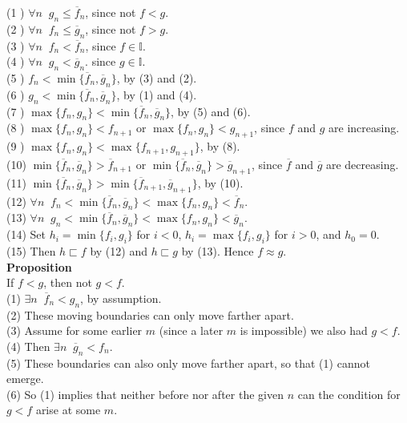\documentclass{article}
\newcommand{\zeqs}{ \mathbb{I}}
\newcommand{\of}{ \overline f}
\newcommand{\og}{ \overline g}
\newcommand{\forks}{ \sqsubset}
\begin{document}
(1  ) $\forall n \;\; g_n \le \of_n$, since not $f < g$.\\
(2  ) $\forall n \;\; f_n \le \og_n$, since not $f > g$.\\
(3  ) $\forall n \;\;f_n < \of_n$, since $f \in \zeqs$.\\
(4  ) $\forall n \;\;g_n < \og_n$. since $g \in \zeqs$.\\
(5  ) $f_n < \min\{\of_n,\og_n\}$, by (3) and (2).\\
(6  ) $g_n < \min\{\of_n,\og_n\}$, by (1) and (4).\\
(7  ) $\max\{f_n,g_n\} < \min\{\of_n,\og_n\}$, by (5) and (6).\\
(8  ) $\max\{f_n,g_n\} < f_{n+1}$ or $\max\{f_{n},g_{n}\} < g_{n+1}$, since $f$ and $g$ are increasing.\\ 
(9  ) $\max\{f_n,g_n\} < \max\{f_{n+1},g_{n+1}\}$, by (8).\\
(10) $\min\{\of_n,\og_n\} > \of_{n+1}$ or $\min\{\of_n,\og_n\} > \og_{n+1}$, since $\of$ and $\og$ are decreasing.\\
(11) $\min\{\of_n,\og_n\} > \min\{\of_{n+1},\og_{n+1}\}$, by (10).\\
(12) $\forall n \;\; f_n < \min\{\of_n,\og_n\} < \max\{f_n,g_n\} < \of_n$.\\
(13) $\forall n \;\; g_n < \min\{\of_n,\og_n\} < \max\{f_n,g_n\} < \og_n$.\\
(14) Set $h_i = \min\{f_i,g_i\}$ for $i < 0$, $h_i = \max\{f_i,g_i\}$ for $ i > 0$, and $h_0 = 0$.\\
(15) Then $h \forks f$ by (12) and $h \forks g$ by (13). Hence $f \approx g$.\\


\textbf{Proposition}\\
If $f < g$, then not $g < f$.\\

(1) $\exists n \;\; \of_n < g_n $, by assumption.\\
(2) These moving boundaries can only move farther apart.\\
(3) Assume for some earlier $m$ (since a later $m$ is impossible) we also had $g < f$.\\
(4) Then $\exists n \;\; \og_n < f_n $.\\
(5) These boundaries can also only move farther apart, so that (1) cannot emerge.\\
(6) So (1) implies that neither before nor after the given $n$ can the condition for $g < f$ arise at some $m$.\\
\end{document}
